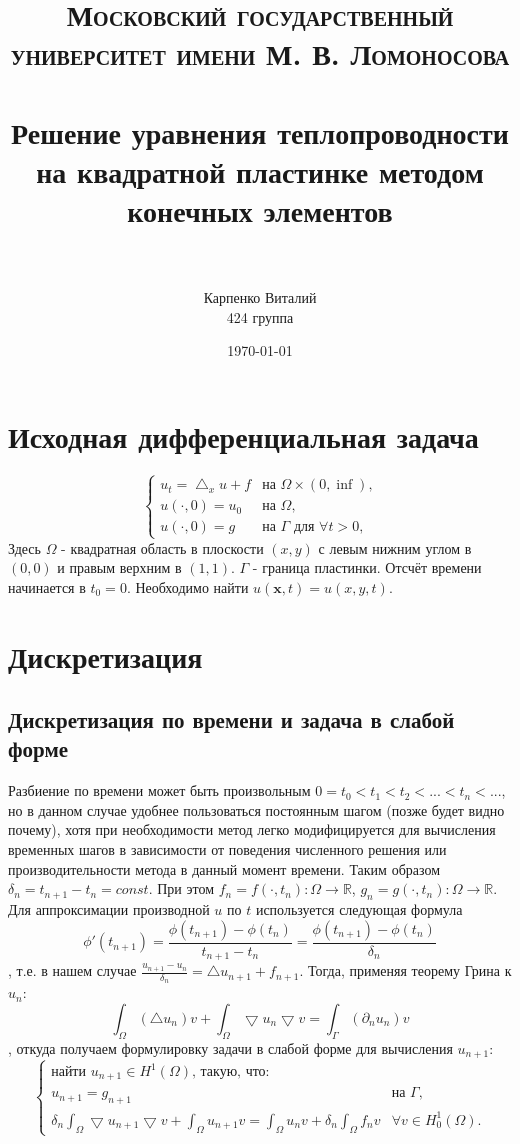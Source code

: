\documentclass[paper=a4, fontsize=13pt]{scrartcl} %
\title{
\normalfont \normalsize
\textsc{Московский государственный университет имени М. В. Ломоносова} \\ [25pt] %
\horrule{0.5pt} \\[0.4cm] %
\huge Решение уравнения теплопроводности на квадратной пластинке методом конечных элементов  \\ %
\horrule{2pt} \\[0.5cm] %
}
\author{Карпенко Виталий \\
424 группа} %
\date{\normalsize\today} %
\numberwithin{equation}{section} %
\numberwithin{figure}{section} %
\numberwithin{table}{section} %
\begin{document}
\maketitle %
\newpage
\section{Исходная дифференциальная задача}
    \[
        \begin{cases}
            u_t = \bigtriangleup_x u + f& \text{на $\Omega \times (0, \inf)$,} \\
            u(\cdot, 0) = u_0& \text{на $\Omega$}, \\
            u(\cdot, 0) = g& \text{на $\Gamma$ для $\forall t > 0$,}
        \end{cases}
    \]
Здесь $\Omega$ - квадратная область в плоскости $(x, y)$ с левым нижним углом в $(0, 0)$ и правым верхним в $(1, 1)$.
$\Gamma$ - граница пластинки. Отсчёт времени начинается в $t_0 = 0$. Необходимо найти $u(\bm{x}, t) = u(x, y, t)$.
\section{Дискретизация}
\subsection{Дискретизация по времени и задача в слабой форме}
Разбиение по времени может быть произвольным $0 = t_0 < t_1 < t_2 < ... < t_n < ...$, но в данном случае удобнее пользоваться постоянным шагом (позже будет видно почему), хотя при необходимости метод легко модифицируется для вычисления временных шагов в зависимости от поведения численного решения или производительности метода в данный момент времени. Таким образом $\delta_n = t_{n+1} - t_n = const$.
При этом $f_n = f(\cdot, t_n) : \Omega \rightarrow \mathbb{R}$, $g_n = g(\cdot, t_n) : \Omega \rightarrow \mathbb{R}$.
Для аппроксимации производной $u$ по $t$ используется следующая формула $$\phi'(t_{n+1}) = \frac{\phi(t_{n+1}) - \phi(t_{n})}{t_{n+1} - t_{n}} = \frac{\phi(t_{n+1}) - \phi(t_{n})}{\delta_n}$$, т.е. в нашем случае $\frac{u_{n+1} - u_n}{\delta_n} = \bigtriangleup u_{n+1} + f_{n+1}$.
Тогда, применяя теорему Грина к $u_n$: $$\int_{\Omega}(\bigtriangleup u_n)v + \int_{\Omega}\bigtriangledown u_n \bigtriangledown v = \int_{\Gamma}(\partial_n u_n)v$$, откуда получаем формулировку задачи в слабой форме для вычисления $u_{n+1}$:
    \[
        \begin{cases}
            \text{найти } u_{n+1} \in H^1(\Omega)\text{, такую, что:} \\
            u_{n+1} = g_{n+1}& \text{на $\Gamma$,} \\
            \delta_n \int_{\Omega} \bigtriangledown u_{n+1} \bigtriangledown v + \int_{\Omega} u_{n+1}v = \int_{\Omega} u_{n}v + \delta_n \int_{\Omega} f_{n}v& \forall v \in H^1_0(\Omega).
        \end{cases}
    \]
\end{document}
